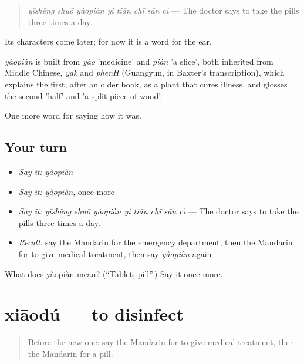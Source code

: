 \begin{quote}
\emph{yīshēng shuō yàopiàn yì tiān chī sān cì} — The doctor says to take the pills three times a day.
\end{quote}

Its characters come later; for now it is a word for the ear.

\begin{cousinweb}
\emph{yàopiàn} is built from \emph{yào} 'medicine' and \emph{piàn} 'a slice', both inherited from Middle Chinese, \emph{yak} and \emph{phenH} (Guangyun, in Baxter's transcription), which explains the first, after an older book, as a plant that cures illness, and glosses the second 'half' and 'a split piece of wood'.
\end{cousinweb}

\begin{grammarlens}[title={What you've built}]
One more word for saying how it was.
\end{grammarlens}

\subsection*{Your turn}
\begin{itemize}
\raggedright
  \item \emph{Say it:} \emph{yàopiàn}
  \item \emph{Say it:} \emph{yàopiàn}, once more
  \item \emph{Say it:} \emph{yīshēng shuō yàopiàn yì tiān chī sān cì} — The doctor says to take the pills three times a day.
  \item \emph{Recall:} say the Mandarin for the emergency department, then the Mandarin for to give medical treatment, then say \emph{yàopiàn} again
\end{itemize}

\begin{tcolorbox}[breakable,colback=teal!4,colframe=teal!35!black,title={Before you move on}]
What does yàopiàn mean? (\textquotedblleft{}Tablet; pill\textquotedblright{}.) Say it once more.
\end{tcolorbox}
\section[xiāodú]{xiāodú — to disinfect}

\label{lesson:ZH-C482-xiaodu}



\begin{quote}
Before the new one: say the Mandarin for to give medical treatment, then the Mandarin for a pill.
\end{quote}

